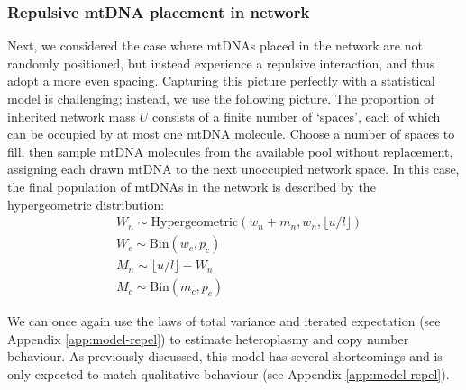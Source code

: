 \documentclass{article}
\newcommand{\be}{\begin{equation}}
\newcommand{\ee}{\end{equation}}
\begin{document}
\subsubsection*{Repulsive mtDNA placement in network}
Next, we considered the case where mtDNAs placed in the network are not randomly positioned, but instead experience a repulsive interaction, and thus adopt a more even spacing. Capturing this picture perfectly with a statistical model is challenging; instead, we use the following picture. The proportion of inherited network mass $U$ consists of a finite number of `spaces', each of which can be occupied by at most one mtDNA molecule. Choose a number of spaces to fill, then sample mtDNA molecules from the available pool without replacement, assigning each drawn mtDNA to the next unoccupied network space. In this case, the final population of mtDNAs in the network is described by the hypergeometric distribution:
\be\label{eq:model-repel}
    \begin{split}
        & W_n \sim \mathrm{Hypergeometric}(w_n+m_n,w_n,\lfloor u/l \rfloor) \\
        & W_c \sim \mathrm{Bin}\left(w_c,p_c\right) \\
        & M_n \sim \lfloor u/l \rfloor-W_n \\
        & M_c \sim \mathrm{Bin}\left(m_c,p_c\right)
    \end{split}
\ee

We can once again use the laws of total variance and iterated expectation  (see Appendix \ref{app:model-repel}) to estimate heteroplasmy and copy number behaviour. As previously discussed, this model has several shortcomings and is only expected to match qualitative behaviour (see Appendix \ref{app:model-repel}).



\clearpage
\newpage
\end{document}
